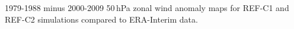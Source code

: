 \label{fig:anomaly}
1979-1988 minus 2000-2009 50\,hPa zonal wind anomaly maps for REF-C1 and REF-C2 simulations compared to ERA-Interim data.

